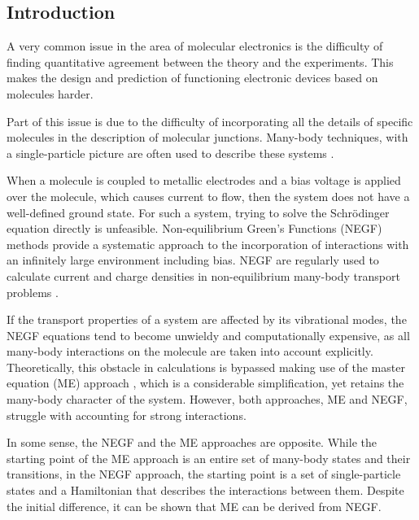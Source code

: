 \documentclass{article}
\begin{document}
\begin{multicols}{2}
        
    \section{Introduction}
        A very common issue in the area of molecular electronics is the difficulty of finding quantitative agreement between the theory and the experiments. This makes the design and prediction of functioning electronic devices based on molecules harder.
        
        Part of this issue is due to the difficulty of incorporating all the details of specific molecules in the description of molecular junctions. Many-body techniques, with a single-particle picture are often used to describe these systems \cite{Tsuneda2014}. 
        
        When a molecule is coupled to metallic electrodes and a bias voltage is applied over the molecule, which causes current to flow, then the system does not have a well-defined ground state. For such a system, trying to solve the Schr\"odinger equation directly is unfeasible. Non-equilibrium Green's Functions (NEGF) methods provide a systematic approach to the incorporation of interactions with an infinitely large environment including bias. NEGF are regularly used to calculate current and charge densities in non-equilibrium many-body transport problems \cite{Mattuck1976, Jauho1994, haugjauho, Datta1997}. 
                
        If the transport properties of a system are affected by its vibrational modes, the NEGF equations tend to become unwieldy and computationally expensive, as all many-body interactions on the molecule are taken into account explicitly. Theoretically, this obstacle in calculations is bypassed making use of the master equation (ME) approach \cite{beenakker}, which is a considerable simplification, yet retains the many-body character of the system. However, both approaches, ME and NEGF, struggle with accounting for strong interactions.
        
        In some sense, the NEGF and the ME approaches are opposite. While the starting point of the ME approach is an entire set of many-body states and their transitions, in the NEGF approach, the starting point is a set of single-particle states and a Hamiltonian that describes the interactions between them. Despite the initial difference, it can be shown that ME can be derived from NEGF.
            

\end{multicols}
\end{document}
